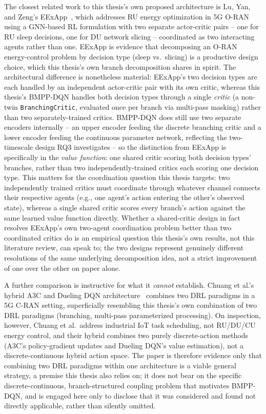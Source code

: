 The closest related work to this thesis's own proposed architecture is Lu,
Yan, and Zeng's EExApp~\cite{luyanzeng2026eexapp}, which addresses RU
energy optimization in 5G O-RAN using a GNN-based RL formulation with two
separate actor-critic pairs -- one for RU sleep decisions, one for DU
network slicing -- coordinated as two interacting agents rather than one.
EExApp is evidence that decomposing an O-RAN energy-control problem by
decision type (sleep vs.\ slicing) is a productive design choice, which
this thesis's own branch decomposition shares in spirit. The architectural
difference is nonetheless material: EExApp's two decision types are each handled by an independent actor-critic
pair with its own critic, whereas this thesis's BMPP-DQN handles both
decision types through a single \emph{critic} (a non-twin
\texttt{BranchingCritic}, evaluated once per branch via multi-pass masking)
rather than two separately-trained critics. BMPP-DQN does still use two
separate encoders internally -- an upper encoder feeding the discrete
branching critic and a lower encoder feeding the continuous parameter
network, reflecting the two-timescale design RQ3 investigates -- so the
distinction from EExApp is specifically in the \emph{value function}: one
shared critic scoring both decision types' branches, rather than two
independently-trained critics each scoring one decision type. This matters
for the coordination question this thesis targets: two independently
trained critics must coordinate through whatever channel connects their
respective agents (e.g., one agent's action entering the other's observed
state), whereas a single shared critic scores every branch's action against
the same learned value function directly. Whether a shared-critic design in
fact resolves EExApp's own two-agent coordination problem better than two
coordinated critics do is an empirical question this thesis's own results,
not this literature review, can speak to; the two designs represent
genuinely different resolutions of the same underlying decomposition idea,
not a strict improvement of one over the other on paper alone.

A further comparison is instructive for what it \emph{cannot} establish.
Chuang et al.'s hybrid A3C and Dueling DQN architecture~\cite{chuang2025hybrid}
combines two DRL paradigms in a 5G C-RAN setting, superficially resembling
this thesis's own combination of two DRL paradigms (branching, multi-pass
parameterized processing). On inspection, however, Chuang et al.\ address
industrial IoT task scheduling, not RU/DU/CU energy control, and their
hybrid combines two purely discrete-action methods (A3C's policy-gradient
updates and Dueling DQN's value estimation), not a discrete-continuous
hybrid action space. The paper is therefore evidence only that combining
two DRL paradigms within one architecture is a viable general strategy, a
premise this thesis also relies on; it does not bear on the specific
discrete-continuous, branch-structured coupling problem that motivates
BMPP-DQN, and is engaged here only to disclose that it was considered and
found not directly applicable, rather than silently omitted.

